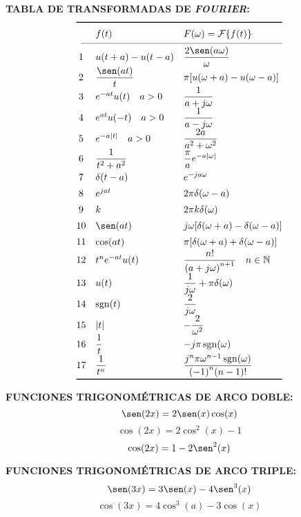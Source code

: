 \documentclass[letter,twoside,8pt]{article}
\DeclareMathOperator{\sgn}{sgn}
\begin{document}
\textbf{TABLA DE TRANSFORMADAS DE \emph{FOURIER}:}
\begin{equation*}
\def\arraystretch{1.4}
\begin{array}{@{}cll@{}}
\toprule
 & f(t) & F(\omega)=\mathcal{F}\{f(t)\}\\
\cmidrule(l){1-3}
 1 & u(t+a)-u(t-a)
   & \dfrac{2\sen(a\omega)}{\omega}\\
 2 & \dfrac{\sen(at)}{t}
   & \pi[u(\omega+a)-u(\omega-a)]\\
 3 & e^{-at}u(t)\quad{a}>0
   & \dfrac{1}{a+j\omega}\\
 4 & e^{at}u(-t)\quad{a}>0
   & \dfrac{1}{a-j\omega}\\
 5 & e^{-a|t|}\quad{a}>0
   & \dfrac{2a}{a^2+\omega^2}\\
 6 & \dfrac{1}{t^2+a^2}
   & \dfrac{\pi}{a}e^{-a|\omega|}\\
 7 & \delta(t-a)
   & e^{-ja\omega}\\
 8 & e^{jat}
   & 2\pi\delta(\omega-a)\\
 9 & k
   & 2{\pi}k\delta(\omega)\\
10 & \sen(at)
   & j\omega[\delta(\omega+a)-\delta(\omega-a)]\\
11 & \cos(at)
   & \pi[\delta(\omega+a)+\delta(\omega-a)]\\
12 & t^{n}e^{-at}u(t)
   & \dfrac{n!}{{(a+j\omega)}^{n+1}}\quad{n}\in\mathbb{N}\\
13 & u(t)
   & \dfrac{1}{j\omega}+\pi\delta(\omega)\\
14 & \sgn(t)
   & \dfrac{2}{j\omega}\\
15 & |t|
   & -\dfrac{2}{\omega^2}\\
16 & \dfrac{1}{t}
   & -j\pi\sgn(\omega)\\
17 & \dfrac{1}{t^n}
   & \dfrac{j^n\pi{\omega}^{n-1}\sgn(\omega)}{{(-1)}^n(n-1)!}\\
\bottomrule
\end{array}
\end{equation*}

\textbf{FUNCIONES TRIGONOMÉTRICAS DE ARCO DOBLE:}
\begin{equation*}
    \sen(2x)=2\sen(x)\cos(x)
\end{equation*}
\begin{equation*}
    \cos(2x)=2\cos^2(x)-1
\end{equation*}
\begin{equation*}
    \cos(2x)=1-2\sen^2(x)
\end{equation*}

\textbf{FUNCIONES TRIGONOMÉTRICAS DE ARCO TRIPLE:}
\begin{equation*}
    \sen(3x)=3\sen(x)-4\sen^3(x)
\end{equation*}
\begin{equation*}
    \cos(3x)=4\cos^3(a)-3\cos(x)
\end{equation*}
\end{document}
